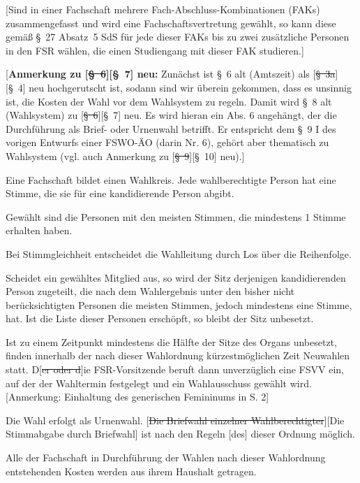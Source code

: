 \documentclass[%
draft,%
multilinesections%
]{fswo}
\newcommand\oldT[1]  {{\color{Gray}[\st{#1}]}}
\newcommand\newT[1]  {{\color{Green}[#1]}}
\newcommand\bemFr[1] {{\color{Red}[#1]}}
\newcommand\oldT[1]{}%
\newcommand\newT[1]{#1}
\newcommand\bemFr[1]{}%
\newcommand\change[2]{\oldT{#1}\newT{#2}}
\begin{document}
\begin{contract}
\newT{Sind in einer Fachschaft mehrere Fach-Abschluss-Kombinationen (FAKs) zusammengefasst und wird eine Fachschaftsvertretung gewählt, so kann diese gemäß \S~27 Absatz~5 SdS für jede dieser FAKs bis zu zwei zusätzliche Personen in den FSR wählen, die einen Studiengang mit dieser FAK studieren.\label{cls-wahl-fsr:abs-fak}}
\end{contract}

\bemFr{\textbf{Anmerkung zu \change{\S~6}{\S~7} neu:} Zunächst ist \S~6 alt (Amtszeit) als \change{\S~3a}{\S~4} neu hochgerutscht ist, sodann sind wir überein gekommen, dass es unsinnig ist, die Kosten der Wahl vor dem Wahlsystem zu regeln. Damit wird \S~8 alt (Wahlsystem) zu \change{\S~6}{\S~7} neu. Es wird hieran ein Abs. 6 angehängt, der die Durchführung als Brief- oder Urnenwahl betrifft. Er entspricht dem \S~9 I des vorigen Entwurfs einer FSWO-ÄO (darin Nr. 6), gehört aber thematisch zu Wahlsystem (vgl. auch Anmerkung zu \change{\S~9}{\S~10} neu).}

\begin{contract}
\label{cls-wahlsystem}
Eine Fachschaft bildet einen Wahlkreis.
Jede wahlberechtigte Person hat eine Stimme, die sie für eine kandidierende Person abgibt.

Gewählt sind die Personen mit den meisten Stimmen, die mindestens 1 Stimme erhalten haben. \label{cls-wahlsystem:abs-mindeststimme}

Bei Stimmgleichheit entscheidet die Wahlleitung durch Los über die Reihenfolge.

Scheidet ein gewähltes Mitglied aus, so wird der Sitz derjenigen kandidierenden Person zugeteilt, die nach dem Wahlergebnis unter den bisher nicht berücksichtigten Personen die meisten Stimmen, jedoch mindestens eine Stimme, hat.
Ist die Liste dieser Personen erschöpft, so bleibt der Sitz unbesetzt.
\label{cls-wahlsystem:abs-nachruecken}

Ist zu einem Zeitpunkt mindestens die Hälfte der Sitze des Organs unbesetzt, finden innerhalb der nach dieser Wahlordnung kürzestmöglichen Zeit Neuwahlen statt.
D\oldT{er oder d}ie FSR-Vorsitzende beruft dann unverzüglich eine FSVV ein, auf der der Wahltermin festgelegt und ein Wahlausschuss gewählt wird. \bemFr{Anmerkung: Einhaltung des generischen Femininums in S. 2}

Die Wahl erfolgt als Urnenwahl.
\change{Die Briefwahl einzelner Wahlberechtigter}{Die Stimmabgabe durch Briefwahl} ist nach den Regeln \newT{des}  dieser Ordnung möglich.


Alle der Fachschaft in Durchführung der Wahlen nach dieser Wahlordnung entstehenden Kosten werden aus ihrem Haushalt getragen.
\end{contract}
\end{document}
